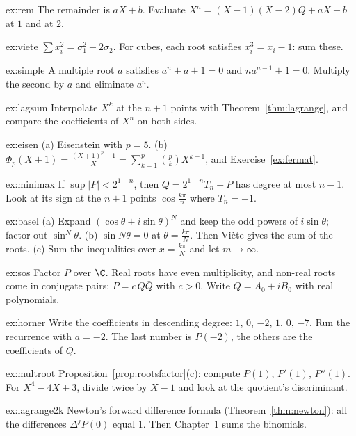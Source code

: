 \begin{hint}{ex:rem}
The remainder is $aX+b$. Evaluate $X^n=(X-1)(X-2)Q+aX+b$ at $1$ and at $2$.
\end{hint}
\begin{hint}{ex:viete}
$\sum x_i^2=\sigma_1^2-2\sigma_2$. For cubes, each root satisfies $x_i^3=x_i-1$: sum these.
\end{hint}
\begin{hint}{ex:simple}
A multiple root $a$ satisfies $a^n+a+1=0$ and $na^{n-1}+1=0$. Multiply the second by $a$ and eliminate $a^n$.
\end{hint}
\begin{hint}{ex:lagsum}
Interpolate $X^k$ at the $n+1$ points with Theorem~\ref{thm:lagrange}, and compare the coefficients of $X^n$ on both sides.
\end{hint}
\begin{hint}{ex:eisen}
(a) Eisenstein with $p=5$. (b) $\Phi_p(X+1)=\frac{(X+1)^p-1}X=\sum_{k=1}^p\binom pkX^{k-1}$, and Exercise~\ref{ex:fermat}.
\end{hint}
\begin{hint}{ex:minimax}
If $\sup|P|<2^{1-n}$, then $Q=2^{1-n}T_n-P$ has degree at most $n-1$. Look at its sign at the $n+1$ points $\cos\frac{k\pi}n$ where $T_n=\pm1$.
\end{hint}
\begin{hint}{ex:basel}
(a) Expand $(\cos\theta+i\sin\theta)^N$ and keep the odd powers of $i\sin\theta$; factor out $\sin^N\theta$. (b) $\sin N\theta=0$ at $\theta=\frac{k\pi}N$. Then Vi\`ete gives the sum of the roots. (c) Sum the inequalities over $x=\frac{k\pi}N$ and let $m\to\infty$.
\end{hint}
\begin{hint}{ex:sos}
Factor $P$ over $\C$. Real roots have even multiplicity, and non-real roots come in conjugate pairs: $P=c\,Q\bar Q$ with $c>0$. Write $Q=A_0+iB_0$ with real polynomials.
\end{hint}
\begin{hint}{ex:horner}
Write the coefficients in descending degree: $1$, $0$, $-2$, $1$, $0$, $-7$. Run the recurrence with $a=-2$. The last number is $P(-2)$, the others are the coefficients of $Q$.
\end{hint}
\begin{hint}{ex:multroot}
Proposition~\ref{prop:rootsfactor}(c): compute $P(1)$, $P'(1)$, $P''(1)$. For $X^4-4X+3$, divide twice by $X-1$ and look at the quotient's discriminant.
\end{hint}
\begin{hint}{ex:lagrange2k}
Newton's forward difference formula (Theorem~\ref{thm:newton}): all the differences $\Delta^jP(0)$ equal $1$. Then Chapter~1 sums the binomials.
\end{hint}
